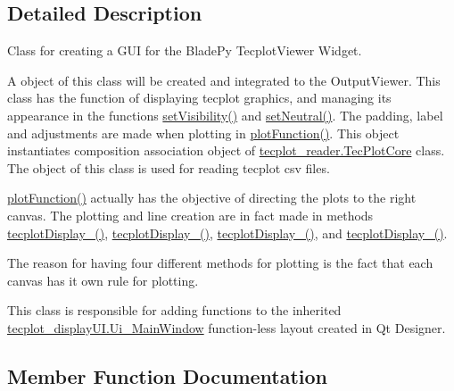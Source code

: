 \subsection{Detailed Description}
Class for creating a G\+UI for the Blade\+Py Tecplot\+Viewer Widget. 

A object of this class will be created and integrated to the Output\+Viewer. This class has the function of displaying tecplot graphics, and managing its appearance in the functions \hyperlink{a00111_ae50e0f3c4051d791ed30a2e9de5233ea}{set\+Visibility()} and \hyperlink{a00111_ad80163041f7884f536d1421860c4adc2}{set\+Neutral()}. The padding, label and adjustments are made when plotting in \hyperlink{a00111_a62c9724fbeda8d8780e57559bada3282}{plot\+Function()}. This object instantiates composition association object of \hyperlink{a00119}{tecplot\+\_\+reader.\+Tec\+Plot\+Core} class. The object of this class is used for reading tecplot csv files.

\hyperlink{a00111_a62c9724fbeda8d8780e57559bada3282}{plot\+Function()} actually has the objective of directing the plots to the right canvas. The plotting and line creation are in fact made in methods \hyperlink{a00111_ae792d997329b65cfed0b8a0a5feaa1a2}{tecplot\+Display\+\_()}, \hyperlink{a00111_aec1f3f862b488e5f66161ca7241908c1}{tecplot\+Display\+\_()}, \hyperlink{a00111_ae29c235476c3ca1ff19f4b933b86ed86}{tecplot\+Display\+\_()}, and \hyperlink{a00111_acdc9dc387494507084a2ab2cc0c8d9ac}{tecplot\+Display\+\_()}.

The reason for having four different methods for plotting is the fact that each canvas has it own rule for plotting.

This class is responsible for adding functions to the inherited \hyperlink{a00115}{tecplot\+\_\+display\+U\+I.\+Ui\+\_\+\+Main\+Window} function-\/less layout created in Qt Designer. 

\subsection{Member Function Documentation}
\hypertarget{a00111_a6b4350a2c6ee537dba6bbe1549778636}{}\label{a00111_a6b4350a2c6ee537dba6bbe1549778636} 
